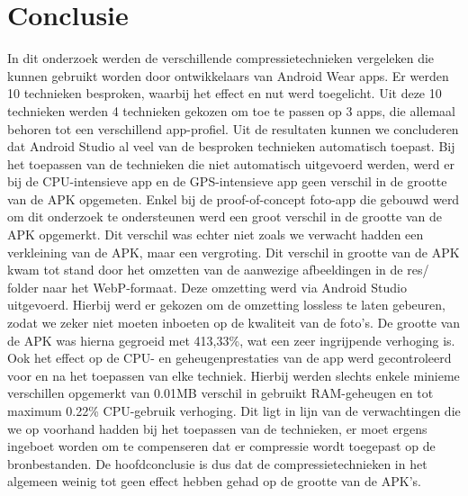 
\chapter{Conclusie}
\label{ch:conclusie}
In dit onderzoek werden de verschillende compressietechnieken vergeleken die kunnen gebruikt worden door ontwikkelaars van Android Wear apps. Er werden 10 technieken besproken, waarbij het effect en nut werd toegelicht. Uit deze 10 technieken werden 4 technieken gekozen om toe te passen op 3 apps, die allemaal behoren tot een verschillend app-profiel. Uit de resultaten kunnen we concluderen dat Android Studio al veel van de besproken technieken automatisch toepast. Bij het toepassen van de technieken die niet automatisch uitgevoerd werden, werd er bij de CPU-intensieve app en de GPS-intensieve app geen verschil in de grootte van de APK opgemeten. Enkel bij de proof-of-concept foto-app die gebouwd werd om dit onderzoek te ondersteunen werd een groot verschil in de grootte van de APK opgemerkt. Dit verschil was echter niet zoals we verwacht hadden een verkleining van de APK, maar een vergroting. Dit verschil in grootte van de APK kwam tot stand door het omzetten van de aanwezige afbeeldingen in de res/ folder naar het WebP-formaat. Deze omzetting werd via Android Studio uitgevoerd. Hierbij werd er gekozen om de omzetting lossless te laten gebeuren, zodat we zeker niet moeten inboeten op de kwaliteit van de foto's. De grootte van de APK was hierna gegroeid met 413,33\%, wat een zeer ingrijpende verhoging is. Ook het effect op de CPU- en geheugenprestaties van de app werd gecontroleerd voor en na het toepassen van elke techniek. Hierbij werden slechts enkele minieme verschillen opgemerkt van 0.01MB verschil in gebruikt RAM-geheugen en tot maximum 0.22\% CPU-gebruik verhoging. Dit ligt in lijn van de verwachtingen die we op voorhand hadden bij het toepassen van de technieken, er moet ergens ingeboet worden om te compenseren dat er compressie wordt toegepast op de bronbestanden. De hoofdconclusie is dus dat de compressietechnieken in het algemeen weinig tot geen effect hebben gehad op de grootte van de APK's.

